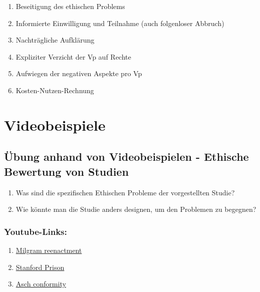\documentclass[
]{book}
\providecommand{\tightlist}{%
  \setlength{\itemsep}{0pt}\setlength{\parskip}{0pt}}
\begin{document}
\begin{enumerate}
\def\labelenumi{\arabic{enumi}.}
\tightlist
\item
  Beseitigung des ethischen Problems
\item
  Informierte Einwilligung und Teilnahme (auch folgenloser Abbruch)
\item
  Nachträgliche Aufklärung
\item
  Expliziter Verzicht der Vp auf Rechte
\item
  Aufwiegen der negativen Aspekte pro Vp
\item
  Kosten-Nutzen-Rechnung
\end{enumerate}

\hypertarget{videobeispiele}{%
\section{Videobeispiele}\label{videobeispiele}}

\hypertarget{uxfcbung-anhand-von-videobeispielen---ethische-bewertung-von-studien}{%
\subsection{Übung anhand von Videobeispielen - Ethische Bewertung von Studien}\label{uxfcbung-anhand-von-videobeispielen---ethische-bewertung-von-studien}}

\begin{enumerate}
\def\labelenumi{\arabic{enumi}.}
\item
  Was sind die spezifischen Ethischen Probleme der vorgestellten Studie?
\item
  Wie könnte man die Studie anders designen, um den Problemen zu begegnen?
\end{enumerate}

\hypertarget{youtube-links}{%
\subsubsection{Youtube-Links:}\label{youtube-links}}

\begin{enumerate}
\def\labelenumi{\arabic{enumi}.}
\item
  \href{https://youtu.be/Xxq4QtK3j0Y}{Milgram reenactment}
\item
  \href{https://youtu.be/760lwYmpXbc}{Stanford Prison}
\item
  \href{https://youtu.be/TYIh4MkcfJA}{Asch conformity}
\end{enumerate}
\end{document}
